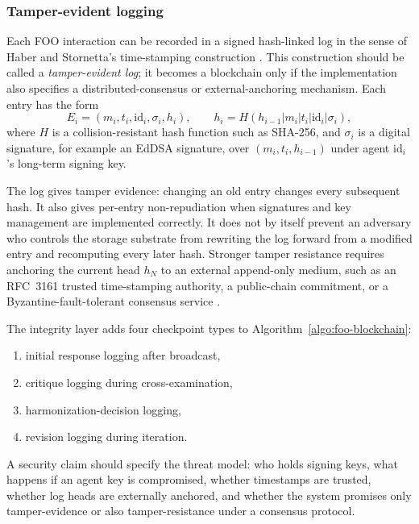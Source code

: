 \documentclass[12pt]{article}
\theoremstyle{definition}
\begin{document}
\subsubsection{Tamper-evident logging}
\label{sec:blockchain}

Each FOO interaction can be recorded in a signed hash-linked log in the sense of
Haber and Stornetta's time-stamping construction \parencite{haber1991timestamp}.
This construction should be called a \emph{tamper-evident log}; it becomes a
blockchain only if the implementation also specifies a distributed-consensus or
external-anchoring mechanism.  Each entry has the form
\[
E_i=(m_i,t_i,\mathrm{id}_i,\sigma_i,h_i),
\qquad
h_i=H(h_{i-1}|m_i|t_i|\mathrm{id}_i|\sigma_i),
\]
where $H$ is a collision-resistant hash function such as SHA-256, and
$\sigma_i$ is a digital signature, for example an EdDSA signature, over
$(m_i,t_i,h_{i-1})$ under agent $\mathrm{id}_i$'s long-term signing key.

The log gives tamper evidence: changing an old entry changes every subsequent
hash.  It also gives per-entry non-repudiation when signatures and key
management are implemented correctly.  It does not by itself prevent an
adversary who controls the storage substrate from rewriting the log forward from
a modified entry and recomputing every later hash.  Stronger tamper resistance
requires anchoring the current head $h_N$ to an external append-only medium,
such as an RFC~3161 trusted time-stamping authority, a public-chain commitment,
or a Byzantine-fault-tolerant consensus service \parencite{rfc3161,castro1999pbft}.

The integrity layer adds four checkpoint types to Algorithm~\ref{algo:foo-blockchain}:
\begin{enumerate}
\item initial response logging after broadcast,
\item critique logging during cross-examination,
\item harmonization-decision logging,
\item revision logging during iteration.
\end{enumerate}
A security claim should specify the threat model: who holds signing keys, what
happens if an agent key is compromised, whether timestamps are trusted, whether
log heads are externally anchored, and whether the system promises only
tamper-evidence or also tamper-resistance under a consensus protocol.
\end{document}

